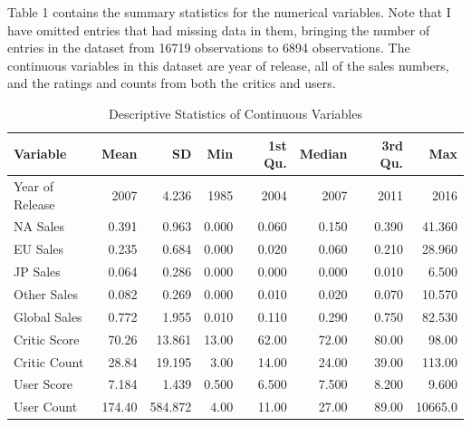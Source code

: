 \documentclass[12pt]{article}
\begin{document}
Table 1 contains the summary statistics for the numerical variables. Note that I have omitted entries that had missing data in them, bringing the number of 
entries in the dataset from 16719 observations to 6894 observations. The continuous variables in this dataset are year of release, all of the sales 
numbers, and the ratings and counts from both the critics and users.

\begin{table}[ht]
  \caption{Descriptive Statistics of Continuous Variables}
\label{tab:ds}
\centering
\begin{tabular}{lrrrrrrr}
    \hline
  Variable & Mean & SD & Min & 1st Qu. & Median & 3rd Qu. & Max \\ 
    \hline
    Year of Release & 2007 & 4.236 & 1985 & 2004 & 2007 & 2011 & 2016\\ 
    NA Sales & 0.391 & 0.963 & 0.000 & 0.060 & 0.150 & 0.390 & 41.360\\ 
    EU Sales & 0.235 & 0.684 & 0.000 & 0.020 & 0.060 & 0.210 & 28.960\\ 
    JP Sales & 0.064 & 0.286 & 0.000 & 0.000 & 0.000 & 0.010 & 6.500\\ 
    Other Sales & 0.082 & 0.269 & 0.000 & 0.010 & 0.020 & 0.070 & 10.570\\ 
    Global Sales & 0.772 & 1.955 & 0.010 & 0.110 & 0.290 & 0.750 & 82.530\\ 
    Critic Score & 70.26 & 13.861 & 13.00 & 62.00 & 72.00 & 80.00 & 98.00\\
    Critic Count & 28.84 & 19.195 & 3.00 & 14.00 & 24.00 & 39.00 & 113.00\\
    User Score & 7.184 & 1.439 & 0.500 & 6.500 & 7.500 & 8.200 & 9.600\\ 
    User Count & 174.40 & 584.872 & 4.00 & 11.00 & 27.00 & 89.00 & 10665.0\\
     \hline
  \end{tabular}
  \end{table}
\end{document}
